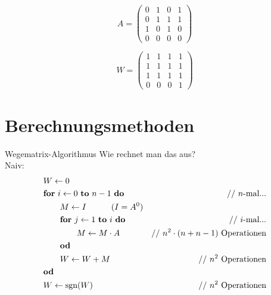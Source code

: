 \begin{frame}
	$$ A = 
	\begin{pmatrix} 
	0 & 1 & 0 & 1 \\ 
	0 & 1 & 1 & 1 \\ 
	1 & 0 & 1 & 0 \\ 
	0 & 0 & 0 & 0 
	\end{pmatrix} $$ 
	\pause 
	
	$$W = 
	\begin{pmatrix} 
	1 & 1 & 1 & 1 \\ 
	1 & 1 & 1 & 1 \\ 
	1 & 1 & 1 & 1 \\ 
	0 & 0 & 0 & 1 
	\end{pmatrix}$$
\end{frame}

\section{Berechnungsmethoden}

\begin{frame}{Wegematrix-Algorithmus}
	Wie rechnet man das aus? \\
	Naiv:
	\begin{align*}
	&W \leftarrow 0 \\ 
	&\mathbf{for}\ i \gets 0\ \mathbf{to}\ n-1\ \mathbf{do} & \text{// $n$-mal...}  \\
	&\qquad M \gets I \qqquad (I = A^0) \\
	&\qquad\mathbf{for}\ j \gets 1\ \mathbf{to}\ i\ \mathbf{do} & \text{// $i$-mal...} \\
	&\qquad\qquad M \gets M \* A & \text{// $n^2 \* (n + n-1)$ Operationen} \\
	&\qquad\mathbf{od} \\
	&\qquad W \gets W + M & \text{// $n^2$ Operationen} \\
	&\mathbf{od} \\
	&W \gets \sgn(W) &  \text{// $n^2$ Operationen} \\
	\end{align*}
\end{frame}


